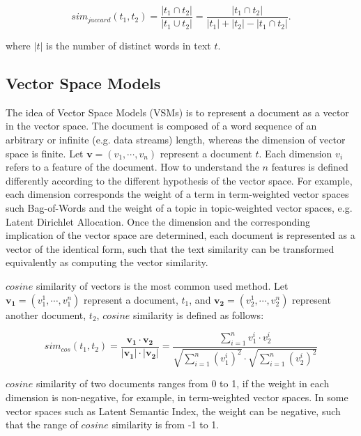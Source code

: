 \begin{equation}
    sim_{jaccard}(t_1, t_2) = \frac{|t_1 \cap t_2|}{|t_1 \cup t_2|} = \frac{|t_1 \cap t_2|}{|t_1| + |t_2| - |t_1 \cap t_2|}. 
\end{equation}

where $|t|$ is the number of distinct words in text $t$.

\bigbreak
\subsection{Vector Space Models}
\label{sec:2.3}

The idea of Vector Space Models (VSMs) is to represent a document as a vector in the vector space. The document is composed of a word sequence of an arbitrary or infinite (e.g. data streams) length, whereas the dimension of vector space is finite. Let $\mathbf{v}=(v_1, \cdots, v_n)$ represent a document $t$. Each dimension $v_i$ refers to a feature of the document. How to understand the $n$ features is defined differently according to the different hypothesis of the vector space. For example, each dimension corresponds the weight of a term in term-weighted vector spaces such Bag-of-Words and the weight of a topic in topic-weighted vector spaces, e.g. Latent Dirichlet Allocation. Once the dimension and the corresponding implication of the vector space are determined, each document is represented as a vector of the identical form, such that the text similarity can be transformed equivalently as computing the vector similarity. 

$cosine$ similarity of vectors is the most common used method. Let $\mathbf{v_1}=(v_1^1, \cdots, v_1^n)$ represent a document, $t_1$, and $\mathbf{v_2}=(v_2^1, \cdots, v_2^n)$ represent another document, $t_2$, $cosine$ similarity is defined as follows:

\begin{equation}
    sim_{cos}(t_1, t_2) = \frac{\mathbf{v_1} \cdot \mathbf{v_2}}{|\mathbf{v_1}| \cdot |\mathbf{v_2}|} = \frac{\sum_{i=1}^n v_1^i \cdot v_2^i}{\sqrt{\sum_{i=1}^n (v_1^i)^2} \cdot \sqrt{\sum_{i=1}^n (v_2^i)^2}}
\end{equation}

$cosine$ similarity of two documents ranges from 0 to 1, if the weight in each dimension is non-negative, for example, in term-weighted vector spaces. In some vector spaces such as Latent Semantic Index, the weight can be negative, such that the range of $cosine$ similarity is from -1 to 1. 


